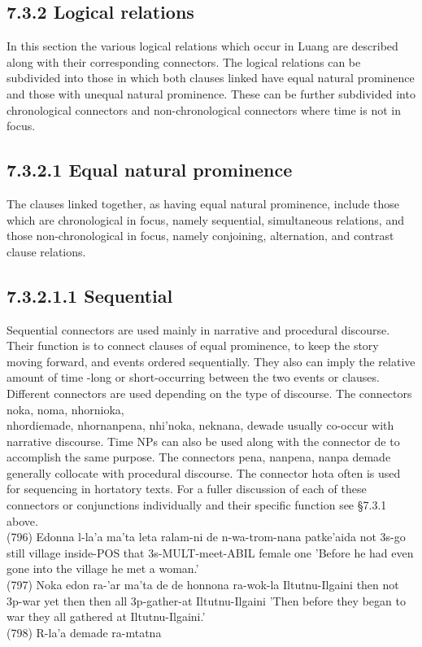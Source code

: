 \documentclass[10pt]{article}
\begin{document}
\subsection*{7.3.2 Logical relations}
In this section the various logical relations which occur in Luang are described along with their corresponding connectors. The logical relations can be subdivided into those in which both clauses linked have equal natural prominence and those with unequal natural prominence. These can be further subdivided into chronological connectors and non-chronological connectors where time is not in focus.

\subsection*{7.3.2.1 Equal natural prominence}
The clauses linked together, as having equal natural prominence, include those which are chronological in focus, namely sequential, simultaneous relations, and those non-chronological in focus, namely conjoining, alternation, and contrast clause relations.

\subsection*{7.3.2.1.1 Sequential}
Sequential connectors are used mainly in narrative and procedural discourse. Their function is to connect clauses of equal prominence, to keep the story moving forward, and events ordered sequentially. They also can imply the relative amount of time -long or short-occurring between the two events or clauses. Different connectors are used depending on the type of discourse. The connectors noka, noma, nhornioka,\\
nhordiemade, nhornanpena, nhi'noka, neknana, dewade usually co-occur with narrative discourse. Time NPs can also be used along with the connector de to accomplish the same purpose. The connectors pena, nanpena, nanpa demade generally collocate with procedural discourse. The connector hota often is used for sequencing in hortatory texts. For a fuller discussion of each of these connectors or conjunctions individually and their specific function see §7.3.1 above.\\
(796) Edonna l-la'a ma'ta leta ralam-ni de n-wa-trom-nana patke'aida not 3s-go still village inside-POS that 3s-MULT-meet-ABIL female one 'Before he had even gone into the village he met a woman.'\\
(797) Noka edon ra-'ar ma'ta de de honnona ra-wok-la Iltutnu-Ilgaini then not 3p-war yet then then all 3p-gather-at Iltutnu-Ilgaini 'Then before they began to war they all gathered at Iltutnu-Ilgaini.'\\
(798) R-la'a demade ra-mtatna
\end{document}

